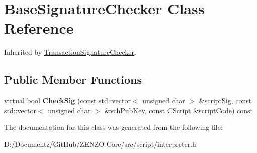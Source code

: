 \hypertarget{class_base_signature_checker}{}\section{Base\+Signature\+Checker Class Reference}
\label{class_base_signature_checker}


Inherited by \mbox{\hyperlink{class_transaction_signature_checker}{Transaction\+Signature\+Checker}}.

\subsection*{Public Member Functions}
\begin{DoxyCompactItemize}
\item 
\mbox{\label{class_base_signature_checker_a1eaaee286e57739edc2a1a1a5bed8352}} 
virtual bool {\bfseries Check\+Sig} (const std\+::vector$<$ unsigned char $>$ \&script\+Sig, const std\+::vector$<$ unsigned char $>$ \&vch\+Pub\+Key, const \mbox{\hyperlink{class_c_script}{C\+Script}} \&script\+Code) const
\end{DoxyCompactItemize}


The documentation for this class was generated from the following file\+:\begin{DoxyCompactItemize}
\item 
D\+:/\+Documentz/\+Git\+Hub/\+Z\+E\+N\+Z\+O-\/\+Core/src/script/interpreter.\+h\end{DoxyCompactItemize}
